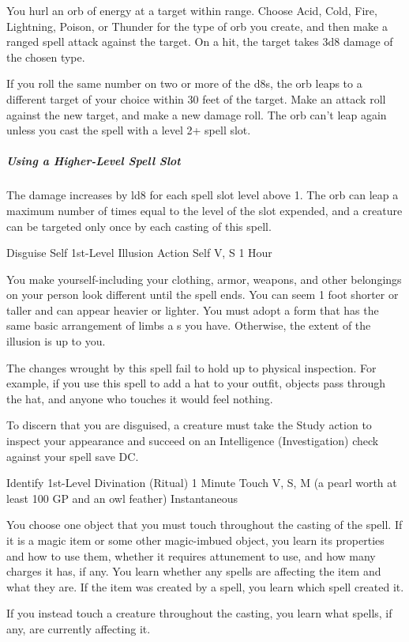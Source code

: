 \documentclass[letterpaper,openany,oneside,twocolumn]{book}
\begin{document}
You hurl an orb of energy at a target within range. Choose Acid, Cold, Fire, Lightning, Poison, or Thunder for the type of orb you create, and then make a ranged spell attack against the target. On a hit, the target takes 3d8 damage of the chosen type.

If you roll the same number on two or more of the d8s, the orb leaps to a different target of your choice within 30 feet of the target. Make an attack roll against the new target, and make a new damage roll. The orb can't leap again unless you cast the spell with a level 2+ spell slot.

\subparagraph*{Using a Higher-Level Spell Slot} The damage increases by ld8 for each spell slot level above 1. The orb can leap a maximum number of times equal to the level of the slot expended, and a creature can be targeted only once by each casting of this spell.

\DndSpellHeader
  {Disguise Self}
  {1st-Level Illusion}
  {Action}
  {Self}
  {V, S}
  {1 Hour}

You make yourself-including your clothing, armor, weapons, and other belongings on your person look different until the spell ends. You can seem 1 foot shorter or taller and can appear heavier or lighter. You must adopt a form that has the same basic arrangement of limbs a s you have. Otherwise, the extent of the illusion is up to you.

The changes wrought by this spell fail to hold up to physical inspection. For example, if you use this spell to add a hat to your outfit, objects pass through the hat, and anyone who touches it would feel nothing. 

To discern that you are disguised, a creature must take the Study action to inspect your appearance and succeed on an Intelligence (Investigation) check against your spell save DC. 

\DndSpellHeader
  {Identify}
  {1st-Level Divination (Ritual)}
  {1 Minute}
  {Touch}
  {V, S, M (a pearl worth at least 100 GP and an owl feather)}
  {Instantaneous}

You choose one object that you must touch throughout the casting of the spell. If it is a magic item or some other magic-imbued object, you learn its properties and how to use them, whether it requires attunement to use, and how many charges it has, if any. You learn whether any spells are affecting the item and what they are. If the item was created by a spell, you learn which spell created it.

If you instead touch a creature throughout the casting, you learn what spells, if any, are currently affecting it.
\end{document}
